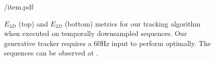 \begin{figure}[h!]
\centering
\begin{overpic} 
[width=\linewidth]
{\currfiledir/item.pdf}
\end{overpic}
% 
\caption{
% 
$E_{3D}$ (top) and $E_{2D}$ (bottom) metrics for our tracking algorithm when executed on temporally downsampled sequences. 
% 
Our generative tracker requires a 60Hz input to perform optimally.
% 
The sequences can be observed at \VideoLimFramerate{}.
% 
}
\label{fig:framerate}
\end{figure}
